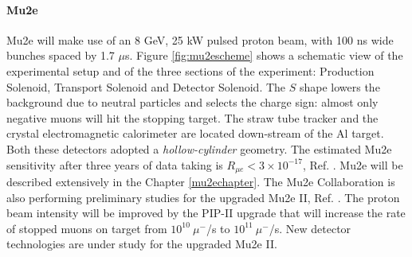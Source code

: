 \paragraph{Mu2e}
Mu2e will make use of an 8 GeV, 25 kW pulsed proton beam, with 100 ns wide bunches spaced by 1.7 $\mu$s. 
Figure \ref{fig:mu2escheme} shows a schematic view of the experimental setup and of the
three sections of the experiment: Production Solenoid, Transport
Solenoid and Detector Solenoid. The $S$ shape lowers the background due to 
neutral particles and selects the charge sign: almost only negative muons will hit the stopping target. 
The straw tube tracker and the crystal electromagnetic calorimeter are located down-stream of the Al target. 
Both these detectors adopted a \textit{hollow-cylinder} geometry. 
The estimated Mu2e sensitivity after three years of data taking is $R_{\mu e} < 3 \times 10^{-17}$, Ref. \cite{universe9010054}.
Mu2e will be described extensively in the Chapter \ref{mu2echapter}.
The Mu2e Collaboration is also performing preliminary studies for the upgraded Mu2e II, Ref. \cite{dukes}. 
The proton beam intensity will be improved by the PIP-II upgrade that will increase the rate of stopped muons 
on target from $10^{10} \ \mu^-$/s to $10^{11} \ \mu^-$/s. New detector technologies are under study for the upgraded
Mu2e II.

